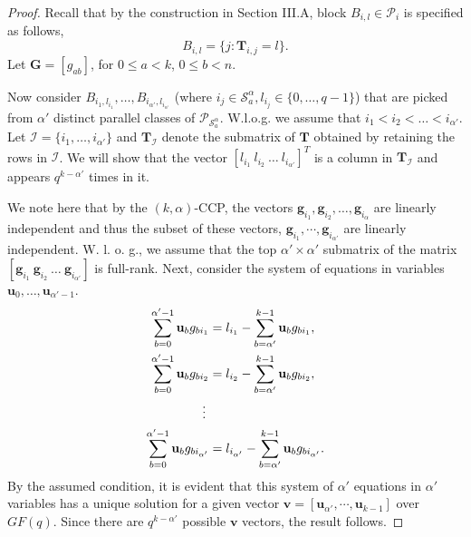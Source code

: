 \documentclass[journal,twocolumn]{IEEEtran}
\theoremstyle{definition}
\newcommand{\calP}{\mathcal{P}}
\newcommand{\calS}{\mathcal{S}}
\newcommand{\calI}{\mathcal{I}}
\newcommand{\bfg}{\mathbf{g}}
\newcommand{\bfv}{\mathbf{v}}
\newcommand{\bfu}{\mathbf{u}}
\newcommand{\bfT}{\mathbf{T}}
\newcommand{\bfG}{\mathbf{G}}
\begin{document}
\begin{proof}
	Recall that by the construction in Section III.A,  block $B_{i,l} \in \calP_i$ is specified as follows,
	$$
	B_{i,l} = \{j : \bfT_{i,j} = l\}.
	$$
	Let $\bfG=[g_{ab}]$, for $0\le a<k$, $0\le b<n$.
	
	Now consider $B_{i_1, l_{i_1}}, \dots, B_{i_{\alpha'}, l_{i_{\alpha'}}}$ (where $i_j \in \calS^\alpha_a, l_{i_j} \in \{0, \dots, q-1\}$) that are picked from $\alpha'$ distinct parallel classes of  $\calP_{\calS^\alpha_a}$. W.l.o.g. we assume that $i_1 < i_2 < \dots < i_{\alpha'}$. Let $\calI =  \{i_1, \dots, i_{\alpha'}\}$ and $\bfT_{\calI}$ denote the submatrix of $\bfT$ obtained by retaining the rows in $\calI$. We will show that the vector $[l_{i_1}~l_{i_2}~\dots~l_{i_{\alpha'}}]^T$ is a column in $\bfT_{\calI}$ and appears $q^{k-\alpha'}$ times in it.
	
	We note here that by the $(k,\alpha)$-CCP, the vectors $\bfg_{i_1}, \bfg_{i_2}, \ldots, \bfg_{i_\alpha}$ are linearly independent and thus the subset of these vectors, $\bfg_{i_1},\cdots,\bfg_{i_{\alpha'}}$ are linearly independent. W. l. o. g., we assume that the top $\alpha' \times \alpha'$ submatrix of the matrix $[\bfg_{i_1}~\bfg_{i_2}~ \dots ~\bfg_{i_{\alpha'}}]$ is full-rank.  Next, consider the system of equations in variables $\bfu_0, \dots, \bfu_{\alpha'-1}$.
	\begin{align*}
	\sum_{b=0}^{\alpha'-1}\bfu_{b}g_{bi_1} &= l_{i_1}-\sum_{b=\alpha'}^{k-1}\bfu_{b}g_{bi_1},\\
	\sum_{b=0}^{\alpha'-1}\bfu_{b}g_{bi_2} &= l_{i_2}-\sum_{b=\alpha'}^{k-1}\bfu_{b}g_{bi_2},\\
	\mathrel{\makebox[\widthof{=}]{\vdots}}\\
	\sum_{b=0}^{\alpha'-1}\bfu_{b}g_{bi_{\alpha'}} &= l_{i_{\alpha'}}-\sum_{b=\alpha'}^{k-1}\bfu_{b}g_{bi_{\alpha'}}.
	\end{align*}
By the assumed condition, it is evident that this system of $\alpha'$ equations in $\alpha'$ variables has a unique solution for a given vector $\bfv=[\bfu_{\alpha'},\cdots, \bfu_{k-1}]$ over $GF(q)$. Since there are $q^{k-\alpha'}$ possible $\bfv$ vectors, the result follows.
	\end{proof}
		
\end{document}
